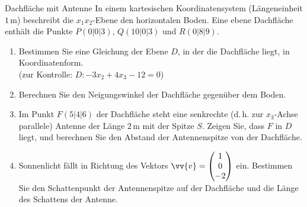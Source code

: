 
\begin{uebung}{Dachfläche mit Antenne}
In einem kartesischen Koordinatensystem (Längeneinheit $1\,\text{m}$) beschreibt die $x_1x_2$-Ebene den horizontalen Boden. Eine ebene Dachfläche enthält die Punkte $P(0|0|3)$, $Q(10|0|3)$ und $R(0|8|9)$.
\begin{enumerate}[label=\alph*)]
  \item Bestimmen Sie eine Gleichung der Ebene $D$, in der die Dachfläche liegt, in Koordinatenform.\\
  {\small (zur Kontrolle: $D: -3x_2+4x_3-12=0$)}
  \item Berechnen Sie den Neigungswinkel der Dachfläche gegenüber dem Boden.
  \item Im Punkt $F(5|4|6)$ der Dachfläche steht eine senkrechte (d.\,h. zur $x_3$-Achse parallele) Antenne der Länge $2\,\text{m}$ mit der Spitze $S$. Zeigen Sie, dass $F$ in $D$ liegt, und berechnen Sie den Abstand der Antennenspitze von der Dachfläche.
  \item Sonnenlicht fällt in Richtung des Vektors $\vv{v} = \begin{pmatrix} 1\\ 0\\ -2\end{pmatrix}$ ein. Bestimmen Sie den Schattenpunkt der Antennenspitze auf der Dachfläche und die Länge des Schattens der Antenne.
\end{enumerate}
\end{uebung}

